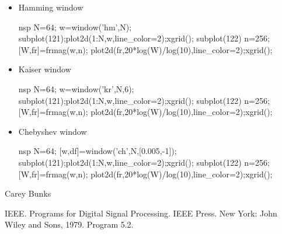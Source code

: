 \begin{examples}
  \begin{itemize}
  \item Hamming window
    \begin{mintednsp}{nsp}
      N=64;
      w=window('hm',N);
      subplot(121);plot2d(1:N,w,line_color=2);xgrid();
      subplot(122)
      n=256;[W,fr]=frmag(w,n);
      plot2d(fr,20*log(W)/log(10),line_color=2);xgrid();
    \end{mintednsp}
  \item Kaiser window
    \begin{mintednsp}{nsp}
      N=64;
      w=window('kr',N,6);
      subplot(121);plot2d(1:N,w,line_color=2);xgrid();
      subplot(122)
      n=256;[W,fr]=frmag(w,n);
      plot2d(fr,20*log(W)/log(10),line_color=2);xgrid();
    \end{mintednsp}
  \item Chebyshev window
    \begin{mintednsp}{nsp}
      N=64;
      [w,df]=window('ch',N,[0.005,-1]);
      subplot(121);plot2d(1:N,w,line_color=2);xgrid();
      subplot(122)
      n=256;[W,fr]=frmag(w,n);
      plot2d(fr,20*log(W)/log(10),line_color=2);xgrid();
    \end{mintednsp}
  \end{itemize}
\end{examples}
\begin{manseealso}
      
\end{manseealso}
\begin{authors}
  Carey Bunks  
\end{authors}
\begin{secbiblio}
  IEEE. Programs for Digital Signal Processing. IEEE Press. New York: John
  Wiley and Sons, 1979. Program 5.2.
\end{secbiblio}
